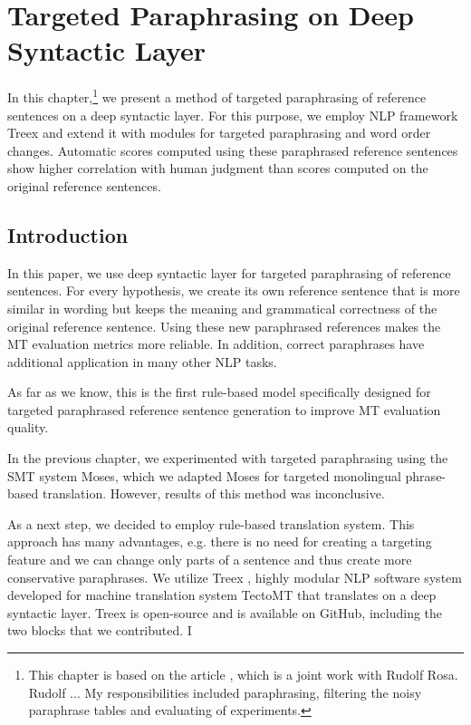 \chapter{Targeted Paraphrasing on Deep Syntactic Layer}


In this chapter,\footnote{This chapter is based on the article 
\citep{barancikova-rosa-2015-targeted}, which is a joint work with Rudolf Rosa. 
Rudolf ... My responsibilities included 
paraphrasing, filtering the noisy paraphrase tables and evaluating of 
experiments.} we present a method of targeted paraphrasing of reference sentences 
on a deep syntactic layer. For this purpose, we employ NLP framework Treex and 
extend it with modules for targeted paraphrasing and word order changes. Automatic scores 
computed using these paraphrased reference sentences show higher correlation with human 
judgment than scores computed on the original reference sentences.


\section{Introduction}

In this paper, we use deep syntactic layer for targeted paraphrasing of 
reference sentences. For every hypothesis, we create its own reference sentence
that is more similar in wording but keeps the meaning and grammatical
correctness of the original reference sentence. Using these new paraphrased 
references makes the MT evaluation metrics more reliable. In addition, correct 
paraphrases have additional application in many other NLP tasks.

As far as we know, this is the first rule-based model specifically designed for
targeted paraphrased reference sentence generation to improve MT evaluation 
quality.

In the previous chapter, we experimented with targeted paraphrasing using the SMT system Moses,
which we adapted Moses for targeted monolingual phrase-based translation. However, results of this 
method was inconclusive.  

As a next step, we decided to employ rule-based translation system. 
This approach has many advantages, e.g. there is no need for creating a targeting feature and we can change only parts of a sentence and thus create more conservative paraphrases. 
We utilize Treex \cite{treex}, highly modular NLP software system developed for machine translation system TectoMT \cite{tectomt} that translates on a deep syntactic layer. 
Treex is open-source and is available on GitHub, including the two blocks that we contributed. I

